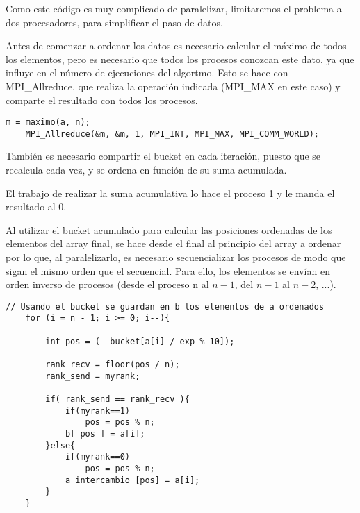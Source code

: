 %
%

Como este código es muy complicado de paralelizar, limitaremos el problema a dos procesadores, para simplificar el paso de datos.


Antes de comenzar a ordenar los datos es necesario calcular el máximo de todos los elementos, pero es necesario que todos los procesos conozcan este dato, ya que influye en el número de ejecuciones del algortmo.
Esto se hace con MPI\_Allreduce, que realiza la operación indicada (MPI\_MAX en este caso) y comparte el resultado con todos los procesos.
\begin{lstlisting}[frame=single]
	m = maximo(a, n);
	MPI_Allreduce(&m, &m, 1, MPI_INT, MPI_MAX, MPI_COMM_WORLD);
\end{lstlisting}


También es necesario compartir el bucket en cada iteración, puesto que se recalcula cada vez, y se ordena en función de su suma acumulada.

El trabajo de realizar la suma acumulativa lo hace el proceso 1 y le manda el resultado al 0.

Al utilizar el bucket acumulado para calcular las posiciones ordenadas de los elementos del array final, se hace desde el final al principio del array a ordenar por lo que, al paralelizarlo, es necesario secuencializar los procesos de modo que sigan el mismo orden que el secuencial. Para ello, los elementos se envían en orden inverso de procesos (desde el proceso n al $n-1$, del $n-1$ al $n-2$, ...).



\begin{lstlisting}[frame=single]
	// Usando el bucket se guardan en b los elementos de a ordenados
	for (i = n - 1; i >= 0; i--){
		
		int pos = (--bucket[a[i] / exp % 10]);

		rank_recv = floor(pos / n);
		rank_send = myrank;

		if( rank_send == rank_recv ){ 
			if(myrank==1)
				pos = pos % n;
			b[ pos ] = a[i];
		}else{
			if(myrank==0)
				pos = pos % n;				
			a_intercambio [pos] = a[i];
		}
	}		
\end{lstlisting}


